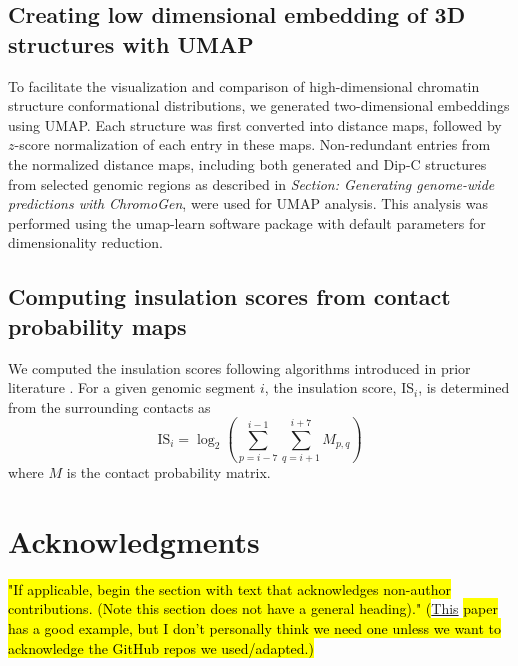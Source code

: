 \documentclass[12pt,letterpaper]{article}
\begin{document}
\subsection*{Creating low dimensional embedding of 3D structures with UMAP}
To facilitate the visualization and comparison of high-dimensional chromatin structure conformational distributions, we generated two-dimensional embeddings using UMAP. Each structure was first converted into distance maps, followed by $z$-score normalization of each entry in these maps. Non-redundant entries from the normalized distance maps, including both generated and Dip-C structures from selected genomic regions as described in \emph{Section: Generating genome-wide predictions with ChromoGen}, were used for UMAP analysis. This analysis was performed using the umap-learn software package \cite{mcinnes2018umap} with default parameters for dimensionality reduction.


\subsection*{Computing insulation scores from contact probability maps}

We computed the insulation scores following algorithms introduced in prior literature \cite{crane2015condensin}. For a given genomic segment $i$, the insulation score, IS$_i$, is determined from the surrounding contacts as 
\begin{equation}
    \label{eq:ins_score}
    \text{IS}_i = \log_2\left(\sum_{p=i-7}^{i-1}\sum_{q=i+1}^{i+7}M_{p,q}\right)
\end{equation}
where $M$ is the contact probability matrix.

\begin{adjustwidth}{-.25in}{}
\printbibliography[title={\hspace{.25in}References}]
\end{adjustwidth}

\section*{Acknowledgments}

\hl{"If applicable, begin the section with text that acknowledges non-author contributions. (Note this section does not have a general heading)." (}\href{https://www.science.org/doi/10.1126/sciadv.ado5560#acknowledgments}{This} \hl{paper has a good example, but I don't personally think we need one unless we want to acknowledge the GitHub repos we used/adapted.)}
\end{document}
